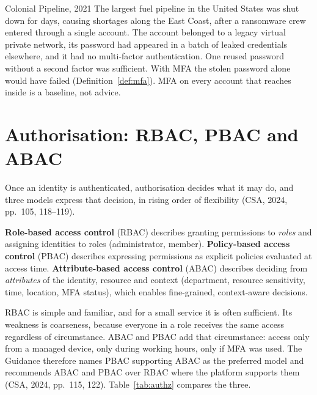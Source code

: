 \begin{realworld}{Colonial Pipeline, 2021}
The largest fuel pipeline in the United States was shut down for days,
causing shortages along the East Coast, after a ransomware crew entered
through a single account. The account belonged to a legacy virtual private
network, its password had appeared in a batch of leaked credentials
elsewhere, and it had no multi-factor authentication. One reused password
without a second factor was sufficient. With MFA the stolen password alone
would have failed (Definition~\ref{def:mfa}). MFA on every account that
reaches inside is a baseline, not advice.
\end{realworld}

\section{Authorisation: RBAC, PBAC and ABAC}

Once an identity is authenticated, authorisation decides what it may do, and
three models express that decision, in rising order of flexibility (CSA,
2024, pp.~105, 118--119).

\begin{definition}\label{def:authz}
\textbf{Role-based access control} (RBAC) describes granting permissions to
\emph{roles} and assigning identities to roles (administrator,
member). \textbf{Policy-based access control} (PBAC) describes expressing
permissions as explicit policies evaluated at access time.
\textbf{Attribute-based access control} (ABAC) describes deciding from
\emph{attributes} of the identity, resource and context (department, resource
sensitivity, time, location, MFA status), which enables fine-grained,
context-aware decisions.
\end{definition}

RBAC is simple and familiar, and for a small service it is often sufficient.
Its weakness is coarseness, because everyone in a role receives the same
access regardless of circumstance. ABAC and PBAC add that circumstance:
access only from a managed device, only during working hours, only if MFA
was used. The Guidance therefore names PBAC supporting ABAC as the preferred
model and recommends ABAC and PBAC over RBAC where the platform supports
them (CSA, 2024, pp.~115, 122). Table~\ref{tab:authz} compares the three.

